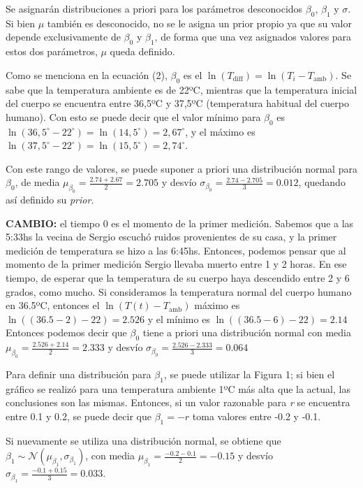 \documentclass[
]{article}
\begin{document}
Se asignarán distribuciones a priori para los parámetros desconocidos
\(\beta_0\), \(\beta_1\) y \(\sigma\). Si bien \(\mu\) también es
desconocido, no se le asigna un prior propio ya que su valor depende
exclusivamente de \(\beta_0\) y \(\beta_1\), de forma que una vez
asignados valores para estos dos parámetros, \(\mu\) queda definido.

Como se menciona en la ecuación (2), \(\beta_0\) es el
\(\ln(T_{\mathrm{diff}}) = \ln(T_i - T_{\mathrm{amb}})\). Se sabe que la
temperatura ambiente es de 22ºC, mientras que la temperatura inicial del
cuerpo se encuentra entre 36,5ºC y 37,5ºC (temperatura habitual del
cuerpo humano). Con esto se puede decir que el valor mínimo para
\(\beta_0\) es \(\ln(36,5^\circ-22^\circ)=\ln(14,5^\circ)=2,67^\circ\),
y el máximo es \(\ln(37,5^\circ-22^\circ)= \ln(15,5^\circ)=2,74^\circ\).

Con este rango de valores, se puede suponer a priori una distribución
normal para \(\beta_0\), de media
\(\mu_{\beta_0} = \frac{2.74 + 2.67}{2}=2.705\) y desvío
\(\sigma_{\beta_0} = \frac{2.74-2.705}{3} = 0.012\), quedando así
definido su \emph{prior}.

\textbf{CAMBIO:} el tiempo 0 es el momento de la primer medición.
Sabemos que a las 5:33hs la vecina de Sergio escuchó ruidos provenientes
de su casa, y la primer medición de temperatura se hizo a las 6:45hs.
Entonces, podemos pensar que al momento de la primer medición Sergio
llevaba muerto entre 1 y 2 horas. En ese tiempo, de esperar que la
temperatura de su cuerpo haya descendido entre 2 y 6 grados, como mucho.
Si consideramos la temperatura normal del cuerpo humano en 36.5ºC,
entonces el \(\ln(T(t) - T_{\mathrm{amb}})\) máximo es
\(\ln((36.5-2) - 22) = 2.526\) y el mínimo es
\(\ln((36.5-6) - 22) = 2.14\) Entonces podemos decir que \(\beta_0\)
tiene a priori una distribución normal con media
\(\mu_{\beta_0} = \frac{2.526 + 2.14}{2}=2.333\) y desvío
\(\sigma_{\beta_0} = \frac{2.526-2.333}{3} = 0.064\)

Para definir una distribución para \(\beta_1\), se puede utilizar la
Figura 1; si bien el gráfico se realizó para una temperatura ambiente
1ºC más alta que la actual, las conclusiones son las mismas. Entonces,
si un valor razonable para \emph{r} se encuentra entre 0.1 y 0.2, se
puede decir que \(\beta_1 = -r\) toma valores entre -0.2 y -0.1.

Si nuevamente se utiliza una distribución normal, se obtiene que
\(\beta_1 \sim \mathcal{N}(\mu_{\beta_1},\sigma_{\beta_1})\), con media
\(\mu_{\beta_1} = \frac{-0.2-0.1}{2} = -0.15\) y desvío
\(\sigma_{\beta_1} = \frac{-0.1+0.15}{3} = 0.033\).
\end{document}
